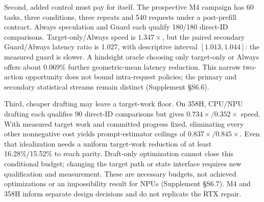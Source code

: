 Second, added control must pay for itself. The prospective M4 campaign has 60 tasks, three conditions, three repeats and 540 requests under a post-prefill contract. Always speculation and Guard each qualify 180/180 direct-ID comparisons. Target-only/Always speed is $1.347\times$, but the paired secondary Guard/Always latency ratio is 1.027, with descriptive interval $[1.013,1.044]$: the measured guard is slower. A hindsight oracle choosing only target-only or Always offers about 0.069\% further geometric-mean latency reduction. This narrow two-action opportunity does not bound intra-request policies; the primary and secondary statistical streams remain distinct (Supplement \S S6.6).

Third, cheaper drafting may leave a target-work floor. On 358H, CPU/NPU drafting each qualifies 90 direct-ID comparisons but gives $0.734\times/0.352\times$ speed. With measured target work and committed progress fixed, eliminating every other nonnegative cost yields prompt-estimator ceilings of $0.837\times/0.845\times$. Even that idealization needs a uniform target-work reduction of at least 16.28\%/15.52\% to reach parity. Draft-only optimization cannot close this conditional budget; changing the target path or state interface requires new qualification and measurement. These are necessary budgets, not achieved optimizations or an impossibility result for NPUs (Supplement \S S6.7). M4 and 358H inform separate design decisions and do not replicate the RTX repair.
\FloatBarrier
